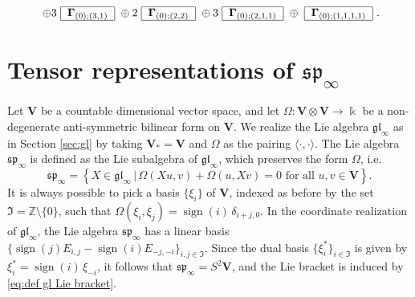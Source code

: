 \documentclass[12pt,reqno]{amsart}
\numberwithin{equation}{section}
\theoremstyle{plain}
\theoremstyle{definition}
\def\Z{\mathbb Z}
\def\gl{\mathfrak{gl}}
\def\sp{\mathfrak{sp}}
\def\o{\otimes}
\def\glV_#1{\boldsymbol\Gamma_{#1}}
\def\VV{\mathbf V}
\def\<{\langle}
\def\>{\rangle}
\begin{document}
\begin{align*}
    \ \oplus 3\
    \begin{tabular}{|c|}
        \hline
        $\glV_{(0);(3,1)}$\\
        \hline
    \end{tabular}
    \ \oplus 2\
    \begin{tabular}{|c|}
        \hline
        $\glV_{(0);(2,2)}$\\
        \hline
    \end{tabular}
    \ \oplus 3\
    \begin{tabular}{|c|}
        \hline
        $\glV_{(0);(2,1,1)}$\\
        \hline
    \end{tabular}
    \ \oplus \
    \begin{tabular}{|c|}
        \hline
        $\glV_{(0);(1,1,1,1)}$\\
        \hline
    \end{tabular}\ .
\end{align*}




\section{Tensor representations of $\sp_\infty$}
\label{sec:sp}


Let $\VV$ be a countable dimensional vector space, and let $\Omega:
\VV \o \VV \to \Bbbk$ be a non-degenerate anti-symmetric bilinear
form on $\VV$. We realize the Lie algebra $\gl_\infty$ as in Section
\ref{sec:gl} by taking $\VV_* = \VV$ and $\Omega$ as the pairing $\<\cdot,\cdot\>$.
The Lie algebra $\sp_\infty$ is defined as the Lie subalgebra of
$\gl_\infty$, which preserves the form $\Omega$, i.e.
\begin{equation*}
    \sp_\infty = \left\{ X \in \gl_\infty \,\biggr|\, \Omega(X u,v) + \Omega(u,X v) = 0 \text{ for all } u,v \in \VV
    \right\}.
\end{equation*}
It is always possible to pick a basis $\{\xi_i\}$ of $\VV$, indexed
as before by the set $\mathfrak I = \Z\setminus\{0\}$, such that
$\Omega(\xi_i,\xi_j) = \operatorname{sign}(i) \, \delta_{i+j,0}$. In
the coordinate realization of $\gl_\infty$, the Lie algebra
$\sp_\infty$ has a linear basis $\{\operatorname{sign}(j) E_{i,j} -
\operatorname{sign}(i) E_{-j,-i}\}_{i,j\in \mathfrak I}$. Since the
dual basis $\{\xi_i^*\}_{i \in \mathfrak I}$ is given by $\xi_i^* =
\operatorname{sign}(i) \, \xi_{-i}$, it follows that $\sp_\infty =
S^2 \VV$, and the Lie bracket is induced by
\eqref{eq:def gl Lie bracket}.
\end{document}
